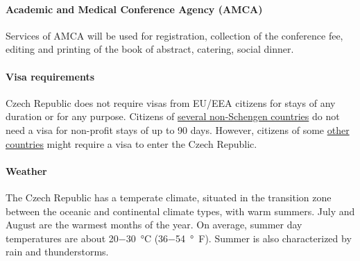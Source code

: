\documentclass[12pt]{extarticle}
\begin{document}
\paragraph{Academic and Medical Conference Agency (AMCA)}
Services of AMCA will be used for registration, collection of the
conference fee, editing and printing of the book of abstract,
catering, social dinner.

\paragraph{Visa requirements}
Czech Republic does not require visas from EU/EEA citizens for stays
of any duration or for any purpose. Citizens of
\href{https://www.mzv.cz/jnp/en/information_for_aliens/short_stay_visa/list_of_states_whose_citizens_are_exempt/index.html}{several
  non-Schengen countries} do not need a visa for non-profit stays of
up to 90 days. However, citizens of some
\href{https://www.mzv.cz/jnp/en/information_for_aliens/short_stay_visa/list_of_states_whose_citizens_are/index.html}{other
  countries} might require a visa to enter the Czech Republic.

\paragraph{Weather}
The Czech Republic has a temperate climate, situated in the transition
zone between the oceanic and continental climate types, with warm
summers. July and August are the warmest months of the year. On
average, summer day temperatures are about
\qty[parse-numbers=false]{20-30}{\celsius}
(\qty[parse-numbers=false]{36-54}{\degree F}). Summer
is also characterized by rain and thunderstorms.
\end{document}
